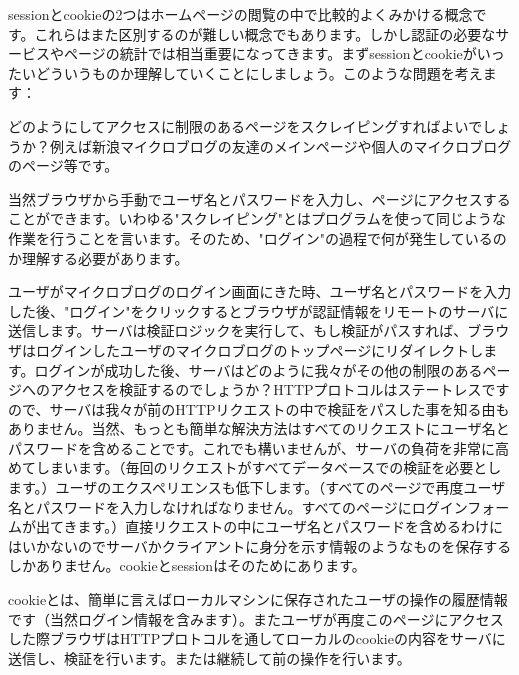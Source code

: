 sessionとcookieの2つはホームページの閲覧の中で比較的よくみかける概念です。これらはまた区別するのが難しい概念でもあります。しかし認証の必要なサービスやページの統計では相当重要になってきます。まずsessionとcookieがいったいどういうものか理解していくことにしましょう。このような問題を考えます：

どのようにしてアクセスに制限のあるページをスクレイピングすればよいでしょうか？例えば新浪マイクロブログの友達のメインページや個人のマイクロブログのページ等です。

当然ブラウザから手動でユーザ名とパスワードを入力し、ページにアクセスすることができます。いわゆる"スクレイピング"とはプログラムを使って同じような作業を行うことを言います。そのため、"ログイン"の過程で何が発生しているのか理解する必要があります。

ユーザがマイクロブログのログイン画面にきた時、ユーザ名とパスワードを入力した後、"ログイン"をクリックするとブラウザが認証情報をリモートのサーバに送信します。サーバは検証ロジックを実行して、もし検証がパスすれば、ブラウザはログインしたユーザのマイクロブログのトップページにリダイレクトします。ログインが成功した後、サーバはどのように我々がその他の制限のあるページへのアクセスを検証するのでしょうか？HTTPプロトコルはステートレスですので、サーバは我々が前のHTTPリクエストの中で検証をパスした事を知る由もありません。当然、もっとも簡単な解決方法はすべてのリクエストにユーザ名とパスワードを含めることです。これでも構いませんが、サーバの負荷を非常に高めてしまいます。（毎回のリクエストがすべてデータベースでの検証を必要とします。）ユーザのエクスペリエンスも低下します。（すべてのページで再度ユーザ名とパスワードを入力しなければなりません。すべてのページにログインフォームが出てきます。）直接リクエストの中にユーザ名とパスワードを含めるわけにはいかないのでサーバかクライアントに身分を示す情報のようなものを保存するしかありません。cookieとsessionはそのためにあります。

cookieとは、簡単に言えばローカルマシンに保存されたユーザの操作の履歴情報です（当然ログイン情報を含みます）。またユーザが再度このページにアクセスした際ブラウザはHTTPプロトコルを通してローカルのcookieの内容をサーバに送信し、検証を行います。または継続して前の操作を行います。

